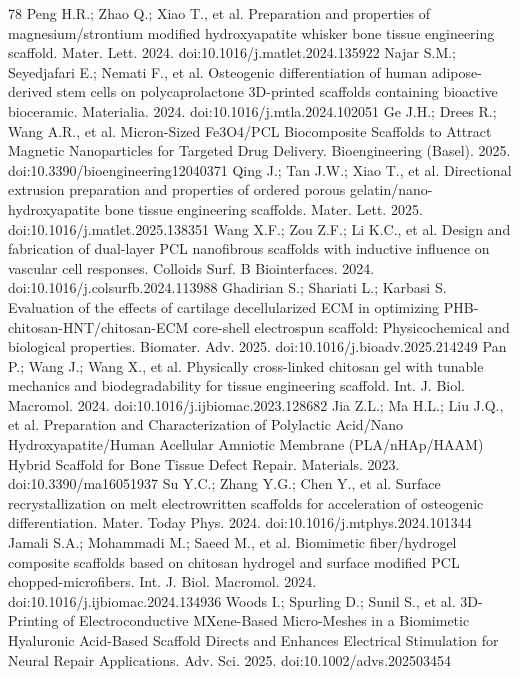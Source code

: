 \documentclass[5p,times,twocolumn]{elsarticle}
\begin{document}
\begin{thebibliography}{78}
 Peng H.R.; Zhao Q.; Xiao T., et al. Preparation and properties of magnesium/strontium modified hydroxyapatite whisker bone tissue engineering scaffold. Mater. Lett. 2024. doi:10.1016/j.matlet.2024.135922
 Najar S.M.; Seyedjafari E.; Nemati F., et al. Osteogenic differentiation of human adipose-derived stem cells on polycaprolactone 3D-printed scaffolds containing bioactive bioceramic. Materialia. 2024. doi:10.1016/j.mtla.2024.102051
 Ge J.H.; Drees R.; Wang A.R., et al. Micron-Sized Fe3O4/PCL Biocomposite Scaffolds to Attract Magnetic Nanoparticles for Targeted Drug Delivery. Bioengineering (Basel). 2025. doi:10.3390/bioengineering12040371
 Qing J.; Tan J.W.; Xiao T., et al. Directional extrusion preparation and properties of ordered porous gelatin/nano-hydroxyapatite bone tissue engineering scaffolds. Mater. Lett. 2025. doi:10.1016/j.matlet.2025.138351
 Wang X.F.; Zou Z.F.; Li K.C., et al. Design and fabrication of dual-layer PCL nanofibrous scaffolds with inductive influence on vascular cell responses. Colloids Surf. B Biointerfaces. 2024. doi:10.1016/j.colsurfb.2024.113988
 Ghadirian S.; Shariati L.; Karbasi S. Evaluation of the effects of cartilage decellularized ECM in optimizing PHB-chitosan-HNT/chitosan-ECM core-shell electrospun scaffold: Physicochemical and biological properties. Biomater. Adv. 2025. doi:10.1016/j.bioadv.2025.214249
 Pan P.; Wang J.; Wang X., et al. Physically cross-linked chitosan gel with tunable mechanics and biodegradability for tissue engineering scaffold. Int. J. Biol. Macromol. 2024. doi:10.1016/j.ijbiomac.2023.128682
 Jia Z.L.; Ma H.L.; Liu J.Q., et al. Preparation and Characterization of Polylactic Acid/Nano Hydroxyapatite/Human Acellular Amniotic Membrane (PLA/nHAp/HAAM) Hybrid Scaffold for Bone Tissue Defect Repair. Materials. 2023. doi:10.3390/ma16051937
 Su Y.C.; Zhang Y.G.; Chen Y., et al. Surface recrystallization on melt electrowritten scaffolds for acceleration of osteogenic differentiation. Mater. Today Phys. 2024. doi:10.1016/j.mtphys.2024.101344
 Jamali S.A.; Mohammadi M.; Saeed M., et al. Biomimetic fiber/hydrogel composite scaffolds based on chitosan hydrogel and surface modified PCL chopped-microfibers. Int. J. Biol. Macromol. 2024. doi:10.1016/j.ijbiomac.2024.134936
 Woods I.; Spurling D.; Sunil S., et al. 3D-Printing of Electroconductive MXene-Based Micro-Meshes in a Biomimetic Hyaluronic Acid-Based Scaffold Directs and Enhances Electrical Stimulation for Neural Repair Applications. Adv. Sci. 2025. doi:10.1002/advs.202503454

\end{thebibliography}
\end{document}
